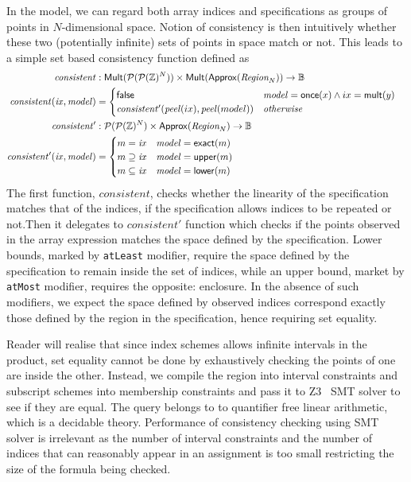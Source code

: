 In the model, we can regard both array indices and specifications as groups of
points in $N$-dimensional space. Notion of consistency is then intuitively
whether these two (potentially infinite) sets of points in space match or not.
This leads to a simple set based consistency function defined as
%
\begin{align*}
  \mathit{consistent} & :
    \mathsf{Mult}(\mathcal{P}(\mathcal{P}(\bz{})^N)) \times
    \mathsf{Mult}(\mathsf{Approx}(\region{N})) \to \mathbb{B} & \\
%
  \mathit{consistent}(\mathit{ix}, \mathit{model}) & = \begin{cases}
    \mathsf{false} & \mathit{model} = \mathsf{once}(x) \wedge ix = \mathsf{mult}(y) \\
    \mathit{consistent'}(\mathit{peel}(ix), \mathit{peel}(model)) & \textit{otherwise}
  \end{cases} \\
%
  \mathit{consistent'} & :
    \mathcal{P}(\mathcal{P}(\bz{})^N) \times
    \mathsf{Approx}(\region{N}) \to \mathbb{B} & \\
%
  \mathit{consistent'}(\mathit{ix}, \mathit{model}) & = \begin{cases}
    m = \mathit{ix} & \mathit{model} = \mathsf{exact}(m) \\
    m \supseteq \mathit{ix} & \mathit{model} = \mathsf{upper}(m) \\
    m \subseteq \mathit{ix} & \mathit{model} = \mathsf{lower}(m)
  \end{cases}
\end{align*}
%
The first function, $\mathit{consistent}$, checks whether the linearity of the
specification matches that of the indices, \ie{} if the specification allows
indices to be repeated or not.Then it delegates to $\mathit{consistent'}$
function which checks if the points observed in the array expression matches
the space defined by the specification. Lower bounds, marked by \texttt{atLeast}
modifier, require the space defined by the specification to remain inside the
set of indices, while an upper bound, market by \texttt{atMost} modifier,
requires the opposite: enclosure. In the absence of such modifiers, we expect
the space defined by observed indices correspond exactly those defined by the
region in the specification, hence requiring set equality.

Reader will realise that since index schemes allows infinite intervals in the
product, set equality cannot be done by exhaustively checking the points of one
are inside the other. Instead, we compile the region into interval constraints
and subscript schemes into membership constraints and pass it to
\textsc{Z3}~\citep{de2008z3} SMT solver to see if they are equal. The query
belongs to to quantifier free linear arithmetic, which is a decidable theory.
Performance of consistency checking using SMT solver is irrelevant as the number
of interval constraints and the number of indices that can reasonably appear in
an assignment is too small restricting the size of the formula being checked.

